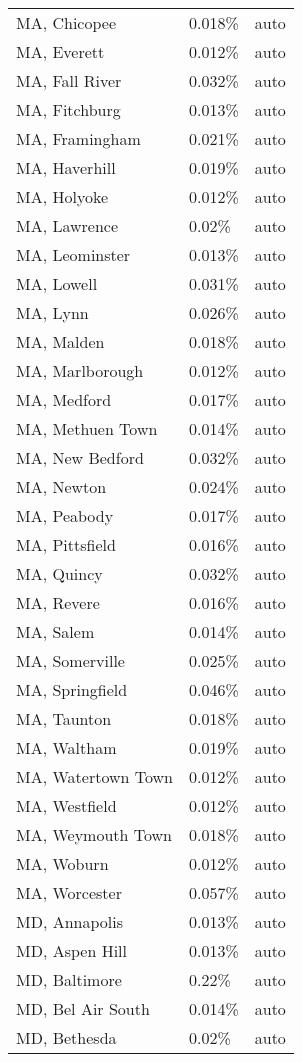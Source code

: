 \begin{longtable}[]{@{}lll@{}}
MA, Chicopee & 0.018\% & auto \\
MA, Everett & 0.012\% & auto \\
MA, Fall River & 0.032\% & auto \\
MA, Fitchburg & 0.013\% & auto \\
MA, Framingham & 0.021\% & auto \\
MA, Haverhill & 0.019\% & auto \\
MA, Holyoke & 0.012\% & auto \\
MA, Lawrence & 0.02\% & auto \\
MA, Leominster & 0.013\% & auto \\
MA, Lowell & 0.031\% & auto \\
MA, Lynn & 0.026\% & auto \\
MA, Malden & 0.018\% & auto \\
MA, Marlborough & 0.012\% & auto \\
MA, Medford & 0.017\% & auto \\
MA, Methuen Town & 0.014\% & auto \\
MA, New Bedford & 0.032\% & auto \\
MA, Newton & 0.024\% & auto \\
MA, Peabody & 0.017\% & auto \\
MA, Pittsfield & 0.016\% & auto \\
MA, Quincy & 0.032\% & auto \\
MA, Revere & 0.016\% & auto \\
MA, Salem & 0.014\% & auto \\
MA, Somerville & 0.025\% & auto \\
MA, Springfield & 0.046\% & auto \\
MA, Taunton & 0.018\% & auto \\
MA, Waltham & 0.019\% & auto \\
MA, Watertown Town & 0.012\% & auto \\
MA, Westfield & 0.012\% & auto \\
MA, Weymouth Town & 0.018\% & auto \\
MA, Woburn & 0.012\% & auto \\
MA, Worcester & 0.057\% & auto \\
MD, Annapolis & 0.013\% & auto \\
MD, Aspen Hill & 0.013\% & auto \\
MD, Baltimore & 0.22\% & auto \\
MD, Bel Air South & 0.014\% & auto \\
MD, Bethesda & 0.02\% & auto \\

\end{longtable}
